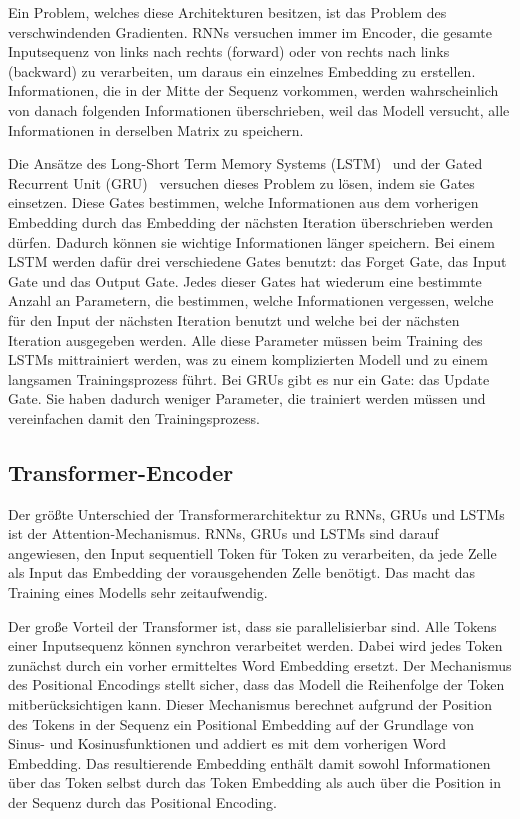 Ein Problem, welches diese Architekturen besitzen, ist das Problem des verschwindenden Gradienten.
RNNs versuchen immer im Encoder, die gesamte Inputsequenz von links nach rechts (forward) oder von rechts nach links (backward) zu verarbeiten, um daraus ein einzelnes Embedding zu erstellen.
Informationen, die in der Mitte der Sequenz vorkommen, werden wahrscheinlich von danach folgenden Informationen überschrieben, weil das Modell versucht, alle Informationen in derselben Matrix zu speichern.

Die Ansätze des Long-Short Term Memory Systems (LSTM)~\cite{hochreiter1997} und der Gated Recurrent Unit (GRU)~\cite{cho2014} versuchen dieses Problem zu lösen, indem sie Gates einsetzen.
Diese Gates bestimmen, welche Informationen aus dem vorherigen Embedding durch das Embedding der nächsten Iteration überschrieben werden dürfen.
Dadurch können sie wichtige Informationen länger speichern.
Bei einem LSTM werden dafür drei verschiedene Gates benutzt: das Forget Gate, das Input Gate und das Output Gate.
Jedes dieser Gates hat wiederum eine bestimmte Anzahl an Parametern, die bestimmen, welche Informationen vergessen, welche für den Input der nächsten Iteration benutzt und welche bei der nächsten Iteration ausgegeben werden.
Alle diese Parameter müssen beim Training des LSTMs mittrainiert werden, was zu einem komplizierten Modell und zu einem langsamen Trainingsprozess führt.
Bei GRUs gibt es nur ein Gate: das Update Gate.
Sie haben dadurch weniger Parameter, die trainiert werden müssen und vereinfachen damit den Trainingsprozess.~\cite{pirani2022}

\subsection{Transformer-Encoder}

Der größte Unterschied der Transformerarchitektur zu RNNs, GRUs und LSTMs ist der Attention-Mechanismus.
RNNs, GRUs und LSTMs sind darauf angewiesen, den Input sequentiell Token für Token zu verarbeiten, da jede Zelle als Input das Embedding der vorausgehenden Zelle benötigt.
Das macht das Training eines Modells sehr zeitaufwendig.

Der große Vorteil der Transformer ist, dass sie parallelisierbar sind.
Alle Tokens einer Inputsequenz können synchron verarbeitet werden.
Dabei wird jedes Token zunächst durch ein vorher ermitteltes Word Embedding ersetzt.
Der Mechanismus des Positional Encodings stellt sicher, dass das Modell die Reihenfolge der Token mitberücksichtigen kann.
Dieser Mechanismus berechnet aufgrund der Position des Tokens in der Sequenz ein Positional Embedding auf der Grundlage von Sinus- und Kosinusfunktionen und addiert es mit dem vorherigen Word Embedding.
Das resultierende Embedding enthält damit sowohl Informationen über das Token selbst durch das Token Embedding als auch über die Position in der Sequenz durch das Positional Encoding.

